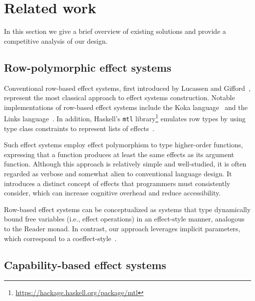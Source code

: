 \documentclass[acmsmall,review,screen]{acmart}
\begin{document}

\section{Related work} \label{sec:related}

In this section we give a brief overview of existing solutions and provide a competitive analysis of our design.

\subsection{Row-polymorphic effect systems} \label{subsec:overview-rows}

Conventional row-based effect systems, first introduced by Lucassen and Gifford~\cite{lucassen1988polymorphic}, represent the most classical approach to effect systems construction.
Notable implementations of row-based effect systems include the Koka language~\cite{leijen2014koka, leijen2017type} and the Links language~\cite{hillerstrom2016liberating}.
In addition, Haskell's \texttt{mtl} library\footnote{\url{https://hackage.haskell.org/package/mtl}} emulates row types by using type class constraints to represent lists of effects~\cite{jones1995functional}.

Such effect systems employ effect polymorphism to type higher-order functions, expressing that a function produces at least the same effects as its argument function.
Although this approach is relatively simple and well-studied, it is often regarded as verbose and somewhat alien to conventional language design.
It introduces a distinct concept of effects that programmers must consistently consider, which can increase cognitive overhead and reduce accessibility.

Row-based effect systems can be conceptualized as systems that type dynamically bound free variables (i.e., effect operations) in an effect-style manner, analogous to the Reader monad.
In contrast, our approach leverages implicit parameters, which correspond to a coeffect-style~\cite{petricek2014coeffects}. %

\subsection{Capability-based effect systems} \label{subsec:overview-caps}

\end{document}
